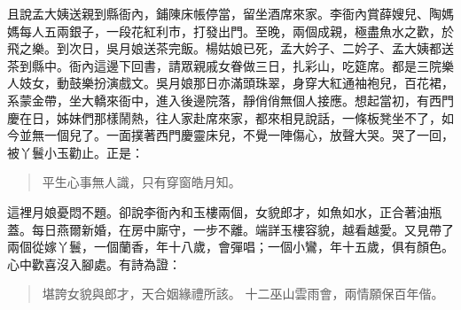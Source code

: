且說孟大姨送親到縣衙內，鋪陳床帳停當，留坐酒席來家。李衙內賞薛嫂兒、陶媽媽每人五兩銀子，一段花紅利市，打發出門。至晚，兩個成親，極盡魚水之歡，於飛之樂。到次日，吳月娘送茶完飯。楊姑娘已死，孟大妗子、二妗子、孟大姨都送茶到縣中。衙內這邊下回書，請眾親戚女眷做三日，扎彩山，吃筵席。都是三院樂人妓女，動鼓樂扮演戲文。吳月娘那日亦滿頭珠翠，身穿大紅通袖袍兒，百花裙，系蒙金帶，坐大轎來衙中，進入後邊院落，靜俏俏無個人接應。想起當初，有西門慶在日，姊妹們那樣鬧熱，往人家赴席來家，都來相見說話，一條板凳坐不了，如今並無一個兒了。一面撲著西門慶靈床兒，不覺一陣傷心，放聲大哭。哭了一回，被丫鬟小玉勸止。正是：
\begin{quote}
平生心事無人識，只有穿窗皓月知。
\end{quote}

這裡月娘憂悶不題。卻說李衙內和玉樓兩個，女貌郎才，如魚如水，正合著油瓶蓋。每日燕爾新婚，在房中廝守，一步不離。端詳玉樓容貌，越看越愛。又見帶了兩個從嫁丫鬟，一個蘭香，年十八歲，會彈唱；一個小鸞，年十五歲，俱有顏色。心中歡喜沒入腳處。有詩為證：
\begin{quote}
堪誇女貌與郎才，天合姻緣禮所該。
十二巫山雲雨會，兩情願保百年偕。
\end{quote}

